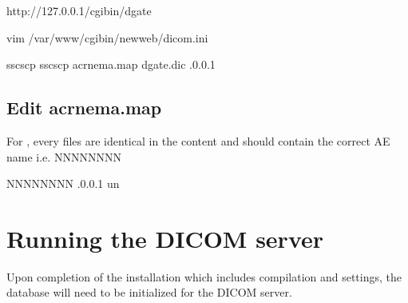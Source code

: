 \documentclass[letterpaper,10pt,english]{sphinxmanual}
\begin{document}
\begin{sphinxVerbatim}[commandchars=\\\{\}]

          http://127.0.0.1/cgi\PYGZhy{}bin/dgate


               
                   
\end{sphinxVerbatim}

%
\begin{sphinxVerbatim}[commandchars=\\\{\}]
vim /var/www/cgi\PYGZhy{}bin/newweb/dicom.ini
\end{sphinxVerbatim}

%
\begin{sphinxVerbatim}[commandchars=\\\{\}]
\PYG{o}{[}sscscp\PYG{o}{]}
                 sscscp
                acrnema.map
                dgate.dic
              .0.0.1
                   
\end{sphinxVerbatim}


\subsection{Edit acrnema.map}
\label{\detokenize{trl2:edit-acrnema-map}}
For , every files are identical in the content and should contain the correct AE name i.e. NNNNNNNN

%
\begin{sphinxVerbatim}[commandchars=\\\{\}]
NNNNNNNN                .0.0.1                   un
\end{sphinxVerbatim}


\section{Running the DICOM server}
\label{\detokenize{trl2:running-the-dicom-server}}
Upon completion of the installation which includes compilation and settings, the database will need to be initialized for the DICOM server.
\end{document}
